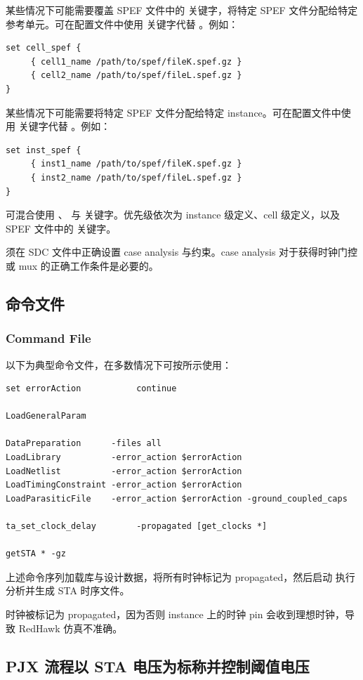 某些情况下可能需要覆盖 SPEF 文件中的  关键字，将特定 SPEF 文件分配给特定参考单元。可在配置文件中使用  关键字代替 。例如：
\begin{lstlisting}
set cell_spef {
     { cell1_name /path/to/spef/fileK.spef.gz }
     { cell2_name /path/to/spef/fileL.spef.gz }
}
\end{lstlisting}

某些情况下可能需要将特定 SPEF 文件分配给特定 instance。可在配置文件中使用  关键字代替 。例如：
\begin{lstlisting}
set inst_spef {
     { inst1_name /path/to/spef/fileK.spef.gz }
     { inst2_name /path/to/spef/fileL.spef.gz }
}
\end{lstlisting}

可混合使用 、 与  关键字。优先级依次为 instance 级定义、cell 级定义，以及 SPEF 文件中的  关键字。

须在 SDC 文件中正确设置 case analysis 与约束。case analysis 对于获得时钟门控或 mux 的正确工作条件是必要的。

\subsection{命令文件}
\subsubsection*{Command File}

以下为典型命令文件，在多数情况下可按所示使用：
\begin{lstlisting}
set errorAction           continue

LoadGeneralParam

DataPreparation      -files all
LoadLibrary          -error_action $errorAction
LoadNetlist          -error_action $errorAction
LoadTimingConstraint -error_action $errorAction
LoadParasiticFile    -error_action $errorAction -ground_coupled_caps

ta_set_clock_delay        -propagated [get_clocks *]

getSTA * -gz
\end{lstlisting}

上述命令序列加载库与设计数据，将所有时钟标记为 propagated，然后启动  执行分析并生成 STA 时序文件。

时钟被标记为 propagated，因为否则 instance 上的时钟 pin 会收到理想时钟，导致 RedHawk 仿真不准确。

\subsection{PJX 流程以 STA 电压为标称并控制阈值电压}

